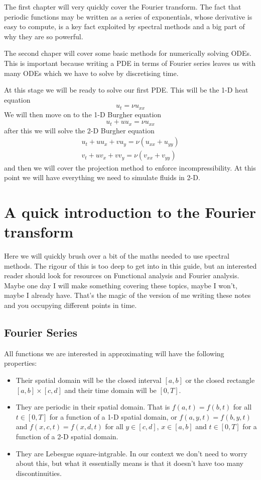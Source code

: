 \documentclass[a4paper,11pt]{article}
\theoremstyle{plain} %
\theoremstyle{remark}
\theoremstyle{definition} %
\begin{document}
The first chapter will very quickly cover the Fourier transform. The fact that periodic functions may be written as a series of exponentials, whose derivative is easy to compute, is a key fact exploited by spectral methods and a big part of why they are so powerful.

The second chaper will cover some basic methods for numerically solving ODEs. This is important because writing a PDE in terms of Fourier series leaves us with many ODEs which we have to solve by discretising time.

At this stage we will be ready to solve our first PDE. This will be the 1-D heat equation
\begin{equation*}
u_t=\nu u_{xx}
\end{equation*}
We will then move on to the 1-D Burgher equation
\begin{equation*}
u_t + u u_x = \nu u_{xx}
\end{equation*}
after this we will solve the 2-D Burgher equation
\begin{align*}
u_t + u u_x +v u_y= \nu \left(u_{xx}+u_{yy}\right)\\
v_t + u v_x + v v_y= \nu\left(v_{xx}+v_{yy}\right)
\end{align*}
and then we will cover the projection method to enforce incompressibility. At this point we will have everything we need to simulate fluids in 2-D.

\section{A quick introduction to the Fourier transform}

Here we will quickly brush over a bit of the maths needed to use spectral methods. The rigour of this is too deep to get into in this guide, but an interested reader should look for resources on Functional analysis and Fourier analysis. Maybe one day I will make something covering these topics, maybe I won't, maybe I already have. That's the magic of the version of me writing these notes and you occupying different points in time.

\subsection{Fourier Series}
All functions we are interested in approximating will have the following properties:
\begin{itemize}
	\item Their spatial domain will be the closed interval $[a,b]$ or the closed rectangle $[a,b]\times[c,d]$ and their time domain will be $[0,T]$.
	\item They are periodic in their spatial domain. That is $f(a,t)=f(b,t)$ for all $t\in [0,T]$ for a function of a 1-D spatial domain, or $f(a,y,t)=f(b,y,t)$ and $f(x,c,t)=f(x,d,t)$ for all $y\in[c,d]$, $x\in[a,b]$ and $t\in[0,T]$ for a function of a 2-D spatial domain.
	\item They are Lebesgue square-intgrable. In our context we don't need to worry about this, but what it essentially means is that it doesn't have too many discontinuities.
\end{itemize}
\end{document}
